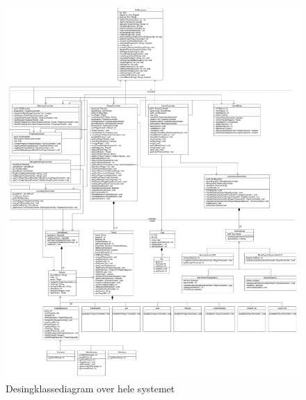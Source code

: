 \documentclass[class=article, crop=false]{standalone}
\begin{document}
\newpage
    \begin{figure}[H]
        \centering
        \includegraphics[scale = 0.2]{diagrams/DKD.pdf}
        \caption{Desingklassediagram over hele systemet}\label{fig:DKD}
    \end{figure}
\end{document}
